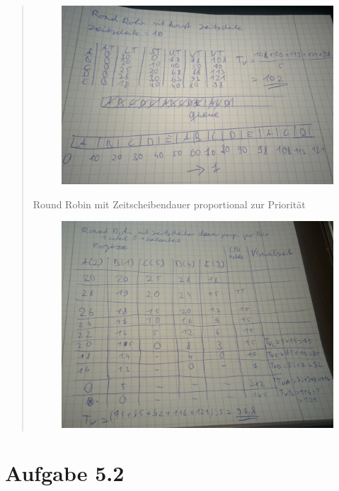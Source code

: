 \begin{quote}
			\begin{figure}[h]
				\includegraphics[width=0.7\linewidth]{content/RR}
				\caption{}
				\label{fig:RR}
			\end{figure}
			\newpage
			Round Robin mit Zeitscheibendauer proportional zur  Priorit\"at\\
			\begin{figure}[h]
				\includegraphics[width=0.7\linewidth]{content/PPRR}
				\caption{}
				\label{fig:PPRR}
			\end{figure}

		\end{quote}
\newpage
\section{Aufgabe 5.2}
